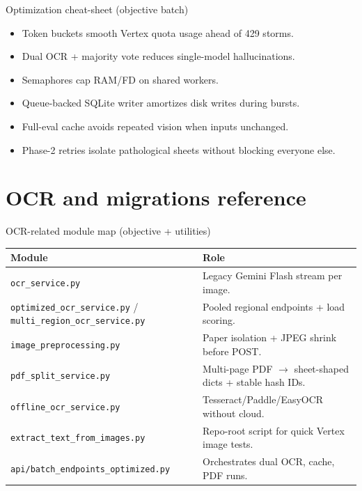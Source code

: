 \documentclass[aspectratio=169]{beamer}
\begin{document}
\begin{frame}{Optimization cheat-sheet (objective batch)}
  \small
  \begin{itemize}
    \item Token buckets smooth Vertex quota usage ahead of 429 storms.
    \item Dual OCR + majority vote reduces single-model hallucinations.
    \item Semaphores cap RAM/FD on shared workers.
    \item Queue-backed SQLite writer amortizes disk writes during bursts.
    \item Full-eval cache avoids repeated vision when inputs unchanged.
    \item Phase-2 retries isolate pathological sheets without blocking everyone else.
  \end{itemize}
\end{frame}

\section{OCR and migrations reference}

\begin{frame}{OCR-related module map (objective + utilities)}
  \tiny
  \begin{tabular}{@{}p{4.85cm}p{9.05cm}@{}}
    \toprule
    Module & Role \\
    \midrule
    \texttt{ocr\_service.py} & Legacy Gemini Flash stream per image. \\
    \texttt{optimized\_ocr\_service.py} / \texttt{multi\_region\_ocr\_service.py} & Pooled regional endpoints + load scoring. \\
    \texttt{image\_preprocessing.py} & Paper isolation + JPEG shrink before POST. \\
    \texttt{pdf\_split\_service.py} & Multi-page PDF $\rightarrow$ sheet-shaped dicts + stable hash IDs. \\
    \texttt{offline\_ocr\_service.py} & Tesseract/Paddle/EasyOCR without cloud. \\
    \texttt{extract\_text\_from\_images.py} & Repo-root script for quick Vertex image tests. \\
    \texttt{api/batch\_endpoints\_optimized.py} & Orchestrates dual OCR, cache, PDF runs. \\
    \bottomrule
  \end{tabular}
\end{frame}
\end{document}
